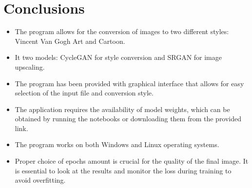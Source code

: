 \documentclass{article}
\begin{document}
\section{Conclusions}
\begin{itemize}
    \setlength\itemsep{0pt}
    \item The program allows for the conversion of images to two different styles: Vincent Van Gogh Art and Cartoon.
    \item It two models: CycleGAN for style conversion and SRGAN for image upscaling.
    \item The program has been provided with graphical interface that allows for easy selection of the input file and conversion style.
    \item The application requires the availability of model weights, which can be obtained by running the notebooks or downloading them from the provided link.
    \item The program works on both Windows and Linux operating systems.
    \item Proper choice of epochs amount is crucial for the quality of the final image. It is essential to look at the results and monitor the loss during training to avoid overfitting.
\end{itemize}
\end{document}
